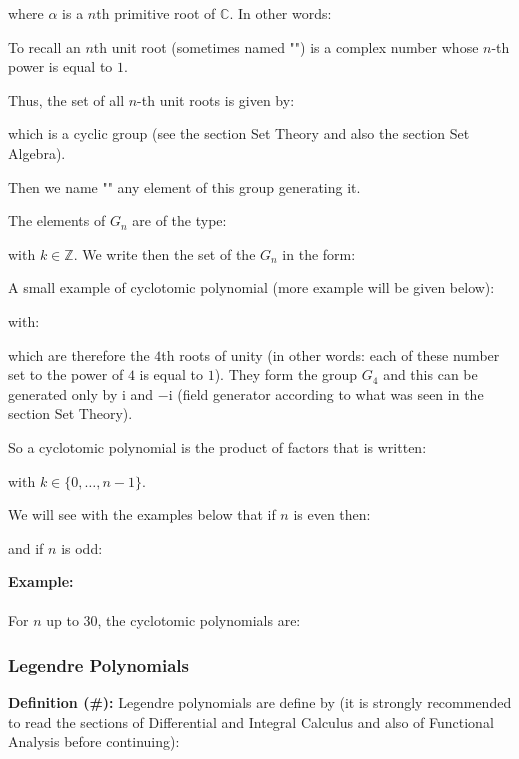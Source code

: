 	where $\alpha$ is a $n$th primitive root of $\mathbb{C}$. In other words:
	
	To recall an $n$th unit root  (sometimes named "") is a complex number whose $n$-th power is equal to $1$.
	
	Thus, the set of all $n$-th unit roots is given by:
	
	which is a cyclic group (see the section Set Theory and also the section Set Algebra).

	Then we name "" any element of this group generating it.
	
	The elements of $G_n$ are of the type:
	
	with $k\in \mathbb{Z}$. We write then the set of the $G_n$ in the form:
	
	A small example of cyclotomic polynomial (more example will be given below):
	
	with:
	
	which are therefore the $4$th roots of unity (in other words: each of these number set to the power of $4$ is equal to $1$). They form the group $G_4$ and this can be generated only by $\mathrm{i}$ and $-\mathrm{i}$ (field generator according to what was seen in the section Set Theory).
	
	So a cyclotomic polynomial is the product of factors that is written:
	
	with $k\in \{0,\ldots,n-1\}$.
	
	We will see with the examples below that if $n$ is even then:
	
	and if $n$ is odd:
	
	
	\pagebreak
	\begin{tcolorbox}[colframe=black,colback=white,sharp corners]
	\textbf{{\Large {}}Example:}\\\\
	For $n$ up to $30$, the cyclotomic polynomials are:
	
	\end{tcolorbox}
	
	\subsubsection{Legendre Polynomials}
	\textbf{Definition (\#\mydef):} Legendre polynomials are define by (it is strongly recommended to read the sections of Differential and Integral Calculus and also of Functional Analysis before continuing):
	

